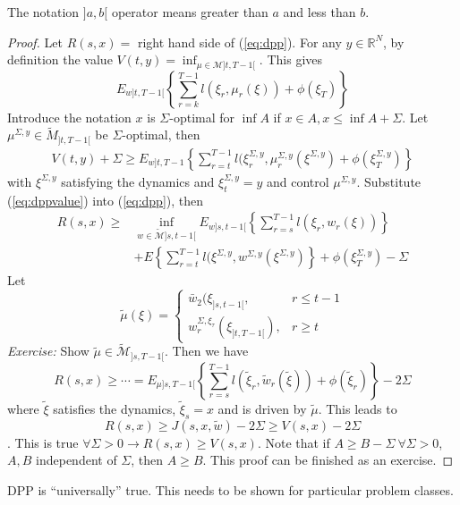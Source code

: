\documentclass[lecture,12pt,]{pcms-l}
\theoremstyle{example}
\begin{document}
The notation $]a,b[$ operator means greater than $a$ and less than $b$.
\begin{proof}
Let $R(s,x) = $ right hand side of (\ref{eq:dpp}). For any $y\in\mathbb{R}^N$, by definition the value $V(t,y) = \inf_{\mu\in\mathcal{M}]t,T-1[}$. This gives
$$E_{w]t,T-1[}\left\lbrace \sum_{r=k}^{T-1}l(\xi_r,\mu_r(\xi))+\phi(\xi_T)\right\rbrace$$
Introduce the notation $x$ is $\Sigma$-optimal for $\inf A$ if $x\in A, x\leq\inf A+\Sigma$. Let $\mu^{\Sigma,y}\in\tilde{M}_{]t,T-1[}$ be $\Sigma$-optimal, then
\begin{align}
\label{eq:dppvalue}
V(t,y) + \Sigma\geq E_{w]t,T-1}\left\lbrace \sum_{r=t}^{T-1}l(\xi_r^{\Sigma,y}, \mu_r^{\Sigma,y}(\xi^{\Sigma,y}) + \phi(\xi_T^{\Sigma,y})\right\rbrace
\end{align}
with $\xi^{\Sigma,y}$ satisfying the dynamics and $\xi_t^{\Sigma,y} = y$ and control $\mu^{\Sigma,y}$. Substitute (\ref{eq:dppvalue}) into (\ref{eq:dpp}), then
\begin{align*}
R(s,x) \geq &\inf_{w\in\tilde{\mathcal{M}}]s,t-1[} E_{w]s,t-1[}\left\lbrace \sum_{r=s}^{T-1}l(\xi_r,w_r(\xi))\right\rbrace \\
&+ E\left\lbrace \sum_{r=t}^{T-1}l(\xi^{\Sigma,y},w^{\Sigma,y}(\xi^{\Sigma,y})\right\rbrace + \phi(\xi_T^{\Sigma,y}) - \Sigma
\end{align*}
Let
$$\tilde{\mu}(\xi) = \begin{cases} \bar{w}_2(\xi_{]s,t-1[}, & r\leq t-1 \\ w_r^{\Sigma,\xi_\tau}(\xi_{]t,T-1[}), & r\geq t \end{cases}$$
\textit{Exercise:} Show $\tilde{\mu}\in\tilde{\mathcal{M}}_{]s,T-1[}$.
Then we have
$$R(s,x) \geq \cdots = E_{\mu]s,T-1[}\left\lbrace\sum_{r=s}^{T-1} l(\tilde{\xi}_r,\tilde{w}_r(\tilde{\xi})) + \phi(\tilde{\xi}_r)\right\rbrace - 2\Sigma$$
where $\tilde{\xi}$ satisfies the dynamics, $\tilde{\xi}_s=x$ and is driven by $\tilde{\mu}$. This leads to
$$R(s,x) \geq J(s,x,\tilde{w}) - 2\Sigma \geq V(s,x)-2\Sigma$$.
This is true $\forall \Sigma>0\to R(s,x)\geq V(s,x)$. Note that if $A\geq B-\Sigma ~\forall \Sigma > 0$, $A,B$ independent of $\Sigma$, then $A\geq B$. This proof can be finished as an exercise.
\end{proof}

DPP is ``universally'' true. This needs to be shown for particular problem classes.
\end{document}

